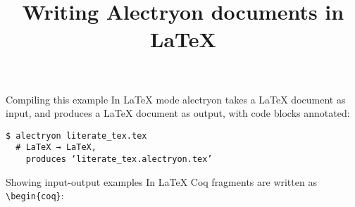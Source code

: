 \documentclass[10pt]{beamer}
\title{Writing Alectryon documents in LaTeX}
\begin{document}
\maketitle

\begin{frame}[fragile]{Compiling this example}
  In LaTeX mode alectryon takes a LaTeX document as input, and produces a LaTeX
  document as output, with code blocks annotated:

  \begin{verbatim}
$ alectryon literate_tex.tex
  # LaTeX → LaTeX,
    produces ‘literate_tex.alectryon.tex’
  \end{verbatim}
\end{frame}

\begin{frame}[fragile]{Showing input-output examples}
  In LaTeX Coq fragments are written as \verb|\begin{coq}|:


\end{frame}
\end{document}
